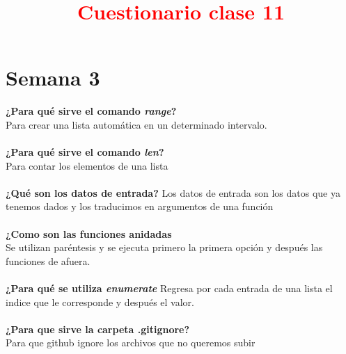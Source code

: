 \documentclass{book}
\begin{document}
	
	
	
	\section{Semana 3}
	\begin{center}
		\title {\textcolor{red}{\Huge \textbf{Cuestionario clase 11}} } 
	\end{center}
	\textbf{¿Para qué sirve el comando \textit{range}?}\\
	Para crear una lista automática en un determinado intervalo.\\
	\\
	\textbf{¿Para qué sirve el comando \textit{len}?}\\
	Para contar los elementos de una lista\\
	\\
	\textbf{¿Qué son los datos de entrada?}
	Los datos de entrada son los datos que ya tenemos dados y los traducimos en argumentos de una función\\
	\\
	\textbf{¿Como son las funciones anidadas}\\
	Se utilizan paréntesis y se ejecuta primero la primera opción y después las funciones de afuera.\\
	\\
	\textbf{¿Para qué se utiliza \textit{enumerate}}
	Regresa por cada entrada de una lista el indice que le corresponde y después el valor.\\
	\\
	\textbf{¿Para que sirve la carpeta .gitignore?}\\
	Para que github ignore los archivos que no queremos subir
	
\end{document}
